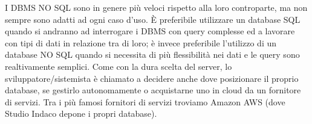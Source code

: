 \documentclass[12pt,a4paper]{article}
\begin{document}
I DBMS NO SQL sono in genere più veloci rispetto alla loro controparte, ma non sempre sono adatti ad ogni caso d’uso. È preferibile utilizzare un database SQL quando si andranno ad interrogare i DBMS con query complesse ed a lavorare con tipi di dati in relazione tra di loro; è invece preferibile l’utilizzo di un database NO SQL quando si necessita di più flessibilità nei dati e le query sono realtivamente semplici.
Come con la dura scelta del server, lo sviluppatore/sistemista è chiamato a decidere anche dove posizionare il proprio database, se gestirlo autonomamente o acquistarne uno in cloud da un fornitore di servizi. Tra i più famosi fornitori di servizi troviamo Amazon AWS (dove Studio Indaco depone i propri database).
\end{document}
